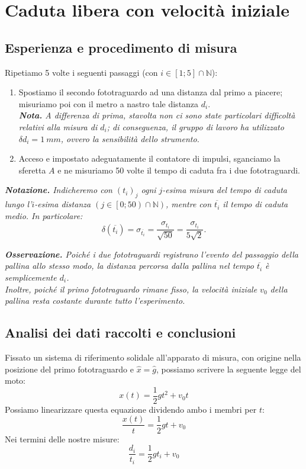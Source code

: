 \documentclass{article}
\begin{document}
\section{Caduta libera con velocità iniziale}
\subsection{Esperienza e procedimento di misura}
Ripetiamo 5 volte i seguenti passaggi (con $i\in\left[1;5\right]\cap\mathbb{N}$):
\begin{enumerate}
    \item
        Spostiamo il secondo fototraguardo ad una distanza dal primo a piacere;
        misuriamo poi con il metro a nastro tale distanza $d_i$.\\
        \emph{
            \textbf{Nota.} A differenza di prima, stavolta non ci sono state
            particolari difficoltà relativi alla misura di $d_i$; di conseguenza,
            il gruppo di lavoro ha utilizzato $\delta d_i = \qty{1}{mm}$, ovvero
            la sensibilità dello strumento.
        }
    \item
        Acceso e impostato adeguatamente il contatore di impulsi, sganciamo la
        sferetta $A$ e ne misuriamo 50 volte il tempo di caduta fra i due
        fototraguardi.
\end{enumerate}

\emph{
    \textbf{Notazione.} Indicheremo con $\left(t_i\right)_j$
    ogni $j$-esima misura del tempo di caduta lungo l'$i$-esima distanza
    $\left(j\in\left[0;50\right)\cap\mathbb{N}\right)$,
    mentre con $\overline{t_i}$ il tempo di caduta medio.
    In particolare:\[
        \delta\!\left(\overline{t_i}\right) = \sigma_{\overline{t_i}} =
        \frac{\sigma_{t_i}}{\sqrt{50}} = \frac{\sigma_{t_i}}{5\sqrt{2}}.
    \]
}


\emph{
    \textbf{Osservazione.} Poiché i due fototraguardi registrano l'evento
    del passaggio della pallina allo stesso modo, la distanza percorsa dalla
    pallina nel tempo $\overline{t_i}$ è semplicemente $d_i$.\\
    Inoltre, poiché il primo fototraguardo rimane fisso, la velocità iniziale
    $v_0$ della pallina resta costante durante tutto l'esperimento.
}

\subsection{Analisi dei dati raccolti e conclusioni}
Fissato un sistema di riferimento solidale all'apparato di misura, con origine
nella posizione del primo fototraguardo e $\hat{x}=\hat{g}$, possiamo scrivere
la seguente legge del moto:
\[x(t) = \frac{1}{2} g t^2 + v_0 t\]
Possiamo linearizzare questa equazione dividendo ambo i membri per $t$:
\[\frac{x(t)}{t} = \frac{1}{2} g t + v_0\]
Nei termini delle nostre misure:
\begin{equation}\label{eq:2}
    \frac{d_i}{t_i} = \frac{1}{2} g t_i + v_0
\end{equation}
\end{document}
